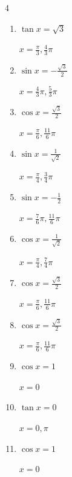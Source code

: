 \begin{multicols}{4}
\begin{enumerate}
        $\displaystyle x = \frac{\pi}{6} , \frac{5}{6}\pi$

  \item $\displaystyle \tan{x}  = \sqrt{3}$

        $\displaystyle x = \frac{\pi}{3} , \frac{4}{3}\pi$

  \item $\displaystyle \sin{x}  = -\frac{\sqrt{3}}{2}$

        $\displaystyle x = \frac{4}{3}\pi , \frac{5}{3}\pi$

  \item $\displaystyle \cos{x}  = \frac{\sqrt{3}}{2}$

        $\displaystyle x = \frac{\pi}{6} , \frac{11}{6}\pi$

  \item $\displaystyle \sin{x}  = \frac{1}{\sqrt{2}}$

        $\displaystyle x = \frac{\pi}{4} , \frac{3}{4}\pi$

  \item $\displaystyle \sin{x}  = -\frac{1}{2}$

        $\displaystyle x = \frac{7}{6}\pi , \frac{11}{6}\pi$

  \item $\displaystyle \cos{x}  = \frac{1}{\sqrt{2}}$

        $\displaystyle x = \frac{\pi}{4} , \frac{7}{4}\pi$

  \item $\displaystyle \cos{x}  = \frac{\sqrt{3}}{2}$

        $\displaystyle x = \frac{\pi}{6} , \frac{11}{6}\pi$

  \item $\displaystyle \cos{x}  = \frac{\sqrt{3}}{2}$

        $\displaystyle x = \frac{\pi}{6} , \frac{11}{6}\pi$

\columnbreak %

  \item $\displaystyle \cos{x}  = 1$

        $\displaystyle x = 0$

  \item $\displaystyle \tan{x}  = 0$

        $\displaystyle x = 0 , \pi$

  \item $\displaystyle \cos{x}  = 1$

        $\displaystyle x = 0$


\end{enumerate}
\end{multicols}
